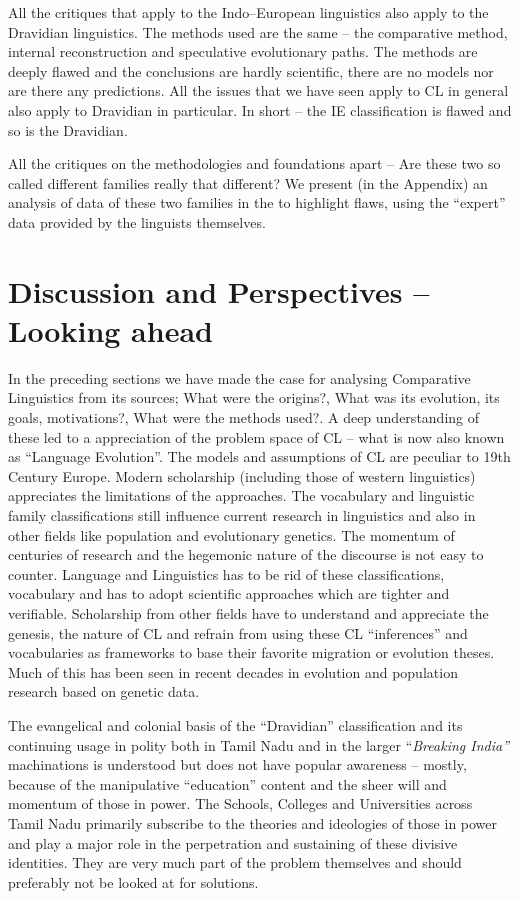 All the critiques that apply to the Indo–European linguistics also apply to the Dravidian linguistics. The methods used are the same – the comparative method, internal reconstruction and speculative evolutionary paths. The methods are deeply flawed and the conclusions are hardly scientific, there are no models nor are there any predictions. All the issues that we have seen apply to CL in general also apply to Dravidian in particular. In short – the IE classification is flawed and so is the Dravidian.

All the critiques on the methodologies and foundations apart – Are these two so called different families really that different? We present (in the Appendix) an analysis of data of these two families in the to highlight flaws, using the “expert” data provided by the linguists themselves.


\section*{Discussion and Perspectives – Looking ahead}

In the preceding sections we have made the case for analysing Comparative Linguistics from its sources; What were the origins?, What was its evolution, its goals, motivations?, What were the methods used?. A deep understanding of these led to a appreciation of the problem space of CL – what is now also known as “Language Evolution”. The models and assumptions of CL are peculiar to 19th Century Europe. Modern scholarship (including those of western linguistics) appreciates the limitations of the approaches. The vocabulary and linguistic family classifications still influence current research in linguistics and also in other fields like population and evolutionary genetics. The momentum of centuries of research and the hegemonic nature of the discourse is not easy to counter. Language and Linguistics has to be rid of these classifications, vocabulary and has to adopt scientific approaches which are tighter and verifiable. Scholarship from other fields have to understand and appreciate the genesis, the nature of CL and refrain from using these CL “inferences” and vocabularies as frameworks to base their favorite migration or evolution theses. Much of this has been seen in recent decades in evolution and population research based on genetic data.

The evangelical and colonial basis of the “Dravidian” classification and its continuing usage in polity both in Tamil Nadu and in the larger “\textit{Breaking India”} machinations is understood but does not have popular awareness – mostly, because of the manipulative “education” content and the sheer will and momentum of those in power. The Schools, Colleges and Universities across Tamil Nadu primarily subscribe to the theories and ideologies of those in power and play a major role in the perpetration and sustaining of these divisive identities. They are very much part of the problem themselves and should preferably not be looked at for solutions.

